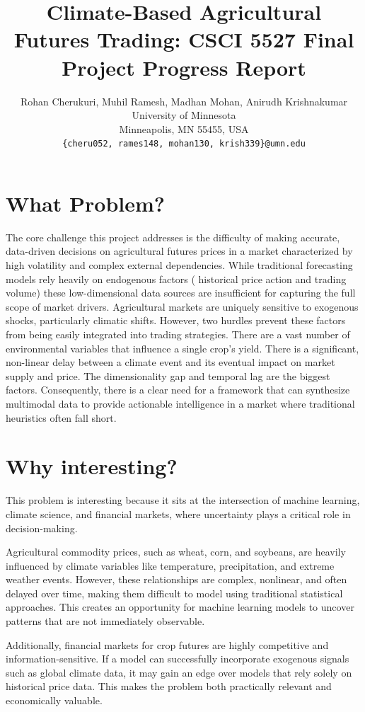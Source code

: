 \documentclass{article} %
\title{Climate-Based Agricultural Futures Trading: CSCI 5527 Final Project Progress Report}
\author{Rohan Cherukuri, Muhil Ramesh, Madhan Mohan, Anirudh Krishnakumar \\
University of Minnesota\\
Minneapolis, MN 55455, USA \\
\texttt{\{cheru052, rames148, mohan130, krish339\}@umn.edu} \\
}
\begin{document}
\maketitle

\section{What Problem?}

The core challenge this project addresses is the difficulty of making accurate, data-driven decisions on agricultural futures prices in a market characterized by high volatility and complex external dependencies. While traditional forecasting models rely heavily on endogenous factors ( historical price action and trading volume) these low-dimensional data sources are insufficient for capturing the full scope of market drivers.
Agricultural markets are uniquely sensitive to exogenous shocks, particularly climatic shifts. However, two hurdles prevent these factors from being easily integrated into trading strategies. There are a vast number of environmental variables  that influence a single crop's yield. There is a significant, non-linear delay between a climate event and its eventual impact on market supply and price. The dimensionality gap and temporal lag are the biggest factors. 
Consequently, there is a clear need for a framework that can synthesize multimodal data to provide actionable intelligence in a market where traditional heuristics often fall short.



\section{Why interesting?}
This problem is interesting because it sits at the intersection of machine learning, climate science, and financial markets, where uncertainty plays a critical role in decision-making.

Agricultural commodity prices, such as wheat, corn, and soybeans,  are heavily influenced by climate variables like temperature, precipitation, and extreme weather events. However, these relationships are complex, nonlinear, and often delayed over time, making them difficult to model using traditional statistical approaches. This creates an opportunity for machine learning models to uncover patterns that are not immediately observable.

Additionally, financial markets for crop futures are highly competitive and information-sensitive. If a model can successfully incorporate exogenous signals such as global climate data, it may gain an edge over models that rely solely on historical price data. This makes the problem both practically relevant and economically valuable.
\end{document}
